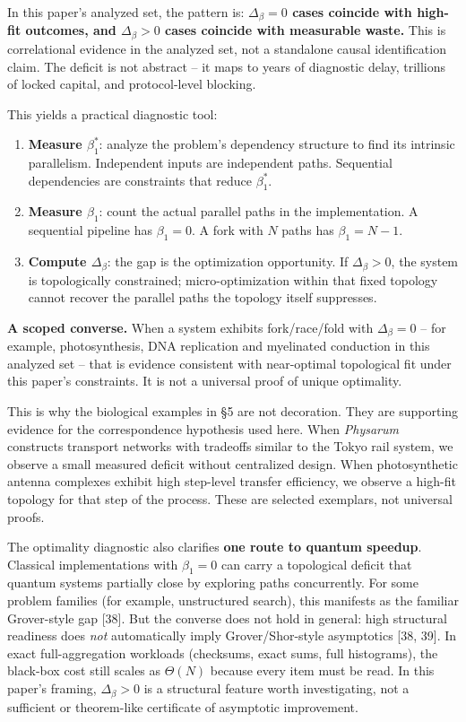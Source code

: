 \documentclass[
  11pt,
]{article}
\begin{document}
In this paper's analyzed set, the pattern is:
\textbf{\(\Delta_\beta = 0\) cases coincide with high-fit outcomes, and
\(\Delta_\beta > 0\) cases coincide with measurable waste.} This is
correlational evidence in the analyzed set, not a standalone causal
identification claim. The deficit is not abstract -- it maps to years of
diagnostic delay, trillions of locked capital, and protocol-level
blocking.

This yields a practical diagnostic tool:

\begin{enumerate}
\def\labelenumi{\arabic{enumi}.}
\item
  \textbf{Measure \(\beta_1^*\)}: analyze the problem's dependency
  structure to find its intrinsic parallelism. Independent inputs are
  independent paths. Sequential dependencies are constraints that reduce
  \(\beta_1^*\).
\item
  \textbf{Measure \(\beta_1\)}: count the actual parallel paths in the
  implementation. A sequential pipeline has \(\beta_1 = 0\). A fork with
  \(N\) paths has \(\beta_1 = N - 1\).
\item
  \textbf{Compute \(\Delta_\beta\)}: the gap is the optimization
  opportunity. If \(\Delta_\beta > 0\), the system is topologically
  constrained; micro-optimization within that fixed topology cannot
  recover the parallel paths the topology itself suppresses.
\end{enumerate}

\textbf{A scoped converse.} When a system exhibits fork/race/fold with
\(\Delta_\beta = 0\) -- for example, photosynthesis, DNA replication and
myelinated conduction in this analyzed set -- that is evidence
consistent with near-optimal topological fit under this paper's
constraints. It is not a universal proof of unique optimality.

This is why the biological examples in §5 are not decoration. They are
supporting evidence for the correspondence hypothesis used here. When
\emph{Physarum} constructs transport networks with tradeoffs similar to
the Tokyo rail system, we observe a small measured deficit without
centralized design. When photosynthetic antenna complexes exhibit high
step-level transfer efficiency, we observe a high-fit topology for that
step of the process. These are selected exemplars, not universal proofs.

The optimality diagnostic also clarifies \textbf{one route to quantum
speedup}. Classical implementations with \(\beta_1 = 0\) can carry a
topological deficit that quantum systems partially close by exploring
paths concurrently. For some problem families (for example, unstructured
search), this manifests as the familiar Grover-style gap {[}38{]}. But
the converse does not hold in general: high structural readiness does
\emph{not} automatically imply Grover/Shor-style asymptotics {[}38,
39{]}. In exact full-aggregation workloads (checksums, exact sums, full
histograms), the black-box cost still scales as \(\Theta(N)\) because
every item must be read. In this paper's framing, \(\Delta_\beta > 0\)
is a structural feature worth investigating, not a sufficient or
theorem-like certificate of asymptotic improvement.
\end{document}
